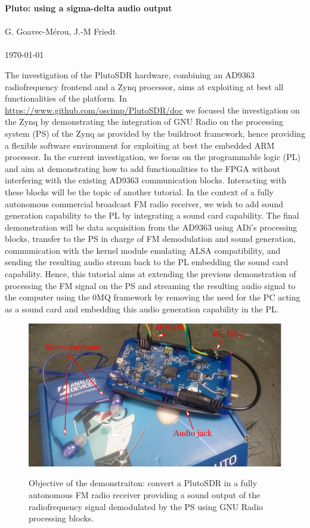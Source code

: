 \documentclass[12pt,oneside]{article}
\begin{document}
\begin{center}
{\bf \Large Pluto: using a sigma-delta audio output} \\ \ \\
G. Goavec-M\'erou, J.-M Friedt \\ \ \\ \today
\end{center}

The investigation of the PlutoSDR hardware, combining an AD9363 radiofrequency frontend
and a Zynq processor, aims at exploiting at best all functionalities of the platform.
In \url{https://www.github.com/oscimp/PlutoSDR/doc} we focused the investigation on the
Zynq by demonstrating the integration of GNU Radio on the processing system (PS) of the
Zynq as provided by the buildroot framework, hence providing a flexible software environment
for exploiting at best the embedded ARM processor. In the current investigation, we focus
on the programmable logic (PL) and aim at demonstrating how to add functionalities to the
FPGA without interfering with the existing AD9363 communication blocks. Interacting with
these blocks will be the topic of another tutorial. In the context of a fully autonomous
commercial broadcast FM radio receiver, we wish to add sound generation capability to the PL
by integrating a sound card capability. The final demonstration will be data acquisition
from the AD9363 using ADi's processing blocks, transfer to the PS in charge of FM demodulation
and sound generation, communication with the kernel module emulating ALSA compatibility, and
sending the resulting audio stream back to the PL embedding the sound card capability. 
Hence, this tutorial aims at extending the previous demonstration of processing the FM signal
on the PS and streaming the resulting audio signal to the computer using the 0MQ framework by
removing the need for the PC acting as a sound card and embedding this audio generation capability
in the PL.

\begin{figure}[h!tb]
\begin{center}
\includegraphics[width=\linewidth]{figures/pluto_audio_ann}
\label{obj}
\end{center}
\caption{Objective of the demonstraiton: convert a PlutoSDR in a fully autonomous FM radio receiver
providing a sound output of the radiofrequency signal demodulated by the PS using GNU Radio processing 
blocks.}
\label{fin}
\end{figure}
\end{document}
